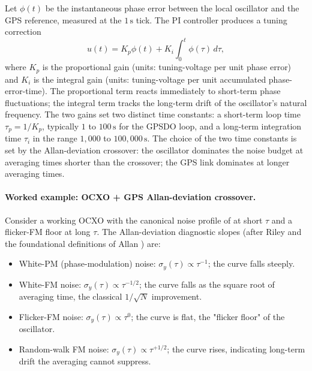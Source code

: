 Let $\phi(t)$ be the instantaneous phase error between the local
oscillator and the GPS reference, measured at the $1 \,\si
{\second}$ tick. The PI controller produces a tuning correction
\[
u(t) = K_{p} \phi(t) + K_{i} \int_{0}^{t} \phi(\tau) \, d\tau,
\]
where $K_{p}$ is the proportional gain (units: tuning-voltage per
unit phase error) and $K_{i}$ is the integral gain (units:
tuning-voltage per unit accumulated phase-error-time). The
proportional term reacts immediately to short-term phase
fluctuations; the integral term tracks the long-term drift of the
oscillator's natural frequency. The two gains set two distinct
time constants: a short-term loop time $\tau_{p} = 1/K_{p}$,
typically $1$ to $100 \,\si{\second}$ for the GPSDO loop, and a
long-term integration time $\tau_{i}$ in the range
$1{,}000$ to $100{,}000 \,\si{\second}$. The choice of the two
time constants is set by the Allan-deviation crossover: the
oscillator dominates the noise budget at averaging times shorter
than the crossover; the GPS link dominates at longer averaging
times.

\paragraph{Worked example: OCXO + GPS Allan-deviation crossover.}
Consider a working OCXO with the canonical noise profile of
 at short
$\tau$ and a flicker-FM floor at long $\tau$. The Allan-deviation
diagnostic slopes (after Riley
\cite{text:ch06t3b-riley-handbook-2008,
std:ch06t3b-itu-tf538-2017} and the foundational definitions of
Allan \cite{paper:ch06t3b-allan-1966}) are:

\begin{itemize}[leftmargin=*]
  \item White-PM (phase-modulation) noise: $\sigma_{y}(\tau)
    \propto \tau^{-1}$; the curve falls steeply.
  \item White-FM noise: $\sigma_{y}(\tau) \propto \tau^{-1/2}$;
    the curve falls as the square root of averaging time, the
    classical $1/\sqrt{N}$ improvement.
  \item Flicker-FM noise: $\sigma_{y}(\tau) \propto \tau^{0}$;
    the curve is flat, the "flicker floor" of the oscillator.
  \item Random-walk FM noise: $\sigma_{y}(\tau) \propto
    \tau^{+1/2}$; the curve rises, indicating long-term drift the
    averaging cannot suppress.
\end{itemize}

